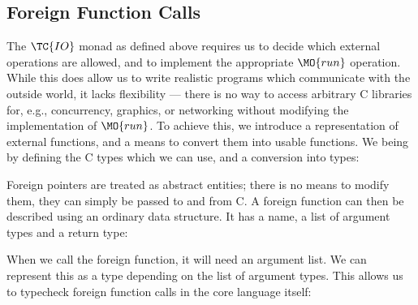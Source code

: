 
\subsection{Foreign Function Calls}

The $\TC{IO}$ monad as defined above requires us to decide which
external operations are allowed, and to implement the appropriate
$\MO{run}$ operation. While this does allow us to write realistic
programs which communicate with the outside world, it lacks
flexibility --- there is no way to access arbitrary C libraries for,
e.g., concurrency, graphics, or networking without modifying the
implementation of $\MO{run}$. To achieve this, we introduce a
representation of external functions, and a means to convert them into
usable \Idris{} functions. We being by defining the C types which we
can use, and a conversion into \Idris{} types:



Foreign pointers are treated as abstract entities; there is no means
to modify them, they can simply be passed to and from C. A foreign
function can then be described using an ordinary data structure. It
has a name, a list of argument types and a return type:


When we call the foreign function, it will need an argument list. We
can represent this as a type depending on the list of argument
types. This allows us to typecheck foreign function calls in the core
language itself:

